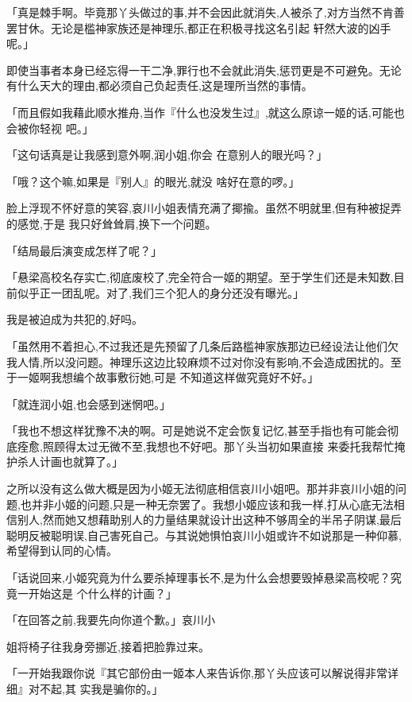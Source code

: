 \documentclass{article}
\begin{document}
「真是棘手啊。毕竟那丫头做过的事,并不会因此就消失,人被杀了,对方当然不肯善罢甘休。无论是槛神家族还是神理乐,都正在积极寻找这名引起
轩然大波的凶手呢。」 

即使当事者本身已经忘得一干二净,罪行也不会就此消失,惩罚更是不可避免。无论有什么天大的理由,都必须自己负起责任,这是理所当然的事情。

「而且假如我藉此顺水推舟,当作『什么也没发生过』,就这么原谅一姬的话,可能也会被你轻视
吧。」 

「这句话真是让我感到意外啊,润小姐,你会
在意别人的眼光吗？」 

\newpage

「哦？这个嘛,如果是『别人』的眼光,就没
啥好在意的啰。」 

脸上浮现不怀好意的笑容,哀川小姐表情充满了揶揄。虽然不明就里,但有种被捉弄的感觉,于是
我只好耸耸肩,换下一个问题。 


「结局最后演变成怎样了呢？」 

「悬梁高校名存实亡,彻底废校了,完全符合一姬的期望。至于学生们还是未知数,目前似乎正一团乱呢。对了,我们三个犯人的身分还没有曝光。」


我是被迫成为共犯的,好吗。 

「虽然用不着担心,不过我还是先预留了几条后路槛神家族那边已经设法让他们欠我人情,所以没问题。神理乐这边比较麻烦不过对你没有影响,不会造成困扰的。至于一姬啊我想编个故事敷衍她,可是
不知道这样做究竟好不好。」 

\newpage


「就连润小姐,也会感到迷惘吧。」 

「我也不想这样犹豫不决的啊。可是她说不定会恢复记忆,甚至手指也有可能会彻底痊愈,照顾得太过无微不至,我想也不好吧。那丫头当初如果直接
来委托我帮忙掩护杀人计画也就算了。」 

之所以没有这么做大概是因为小姬无法彻底相信哀川小姐吧。那并非哀川小姐的问题,也并非小姬的问题,只是一种无奈罢了。我想小姬应该和我一样,打从心底无法相信别人,然而她又想藉助别人的力量结果就设计出这种不够周全的半吊子阴谋,最后聪明反被聪明误,自己害死自己。与其说她惧怕哀川小姐或许不如说那是一种仰慕,希望得到认同的心情。

「话说回来,小姬究竟为什么要杀掉理事长不,是为什么会想要毁掉悬梁高校呢？究竟一开始这是
个什么样的计画？」 

「在回答之前,我要先向你道个歉。」哀川小

\newpage
姐将椅子往我身旁挪近,接着把脸靠过来。 

「一开始我跟你说『其它部份由一姬本人来告诉你,那丫头应该可以解说得非常详细』对不起,其
实我是骗你的。」 
\end{document}
